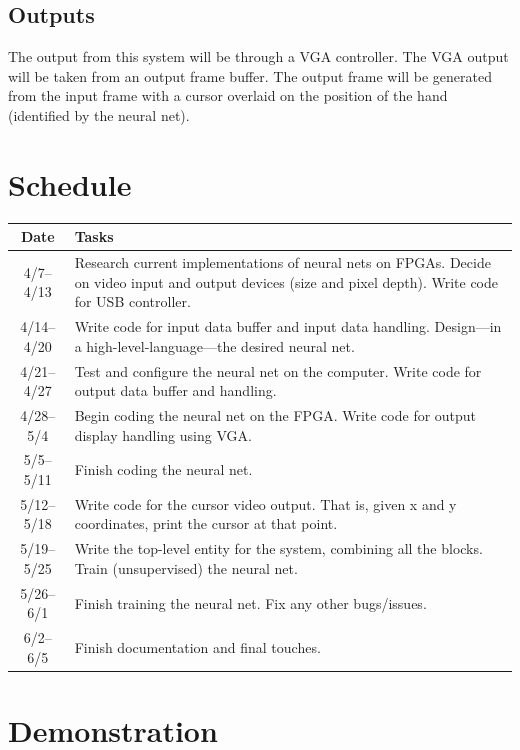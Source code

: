 \documentclass[10pt]{article}
\begin{document}
\subsection{Outputs}
\label{sub:outputs}

The output from this system will be through a VGA controller. The VGA output
will be taken from an output frame buffer. The output frame will be generated
from the input frame with a cursor overlaid on the position of the hand
(identified by the neural net).

\section{Schedule}
\label{sec:schedule}

\setlength\extrarowheight{3pt}
\begin{tabularx}{\textwidth}{c X}
    Date & Tasks \\
    \midrule
    4/7--4/13 & Research current implementations of neural nets on FPGAs. Decide
    on video input and output devices (size and pixel depth). Write code for USB
    controller. \\
    4/14--4/20 & Write code for input data buffer and input data handling.
    Design---in a high-level-language---the desired neural net. \\
    4/21--4/27 & Test and configure the neural net on the computer. Write code
    for output data buffer and handling. \\
    4/28--5/4 & Begin coding the neural net on the FPGA\@. Write code for output
    display handling using VGA\@. \\
    5/5--5/11 & Finish coding the neural net. \\
    5/12--5/18 & Write code for the cursor video output. That is, given x and y
    coordinates, print the cursor at that point. \\
    5/19--5/25 & Write the top-level entity for the system, combining all the
    blocks. Train (unsupervised) the neural net. \\
    5/26--6/1 & Finish training the neural net. Fix any other bugs/issues. \\
    6/2--6/5 & Finish documentation and final touches.
\end{tabularx}

\section{Demonstration}
\label{sec:demonstration}
\end{document}
